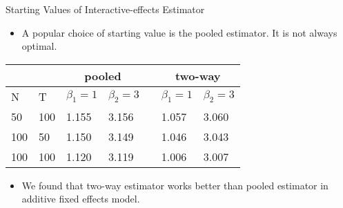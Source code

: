 \documentclass{beamer}
\begin{document}
\begin{frame}{Starting Values of Interactive-effects Estimator}

\begin{itemize}
    \item A popular choice of starting value is the pooled estimator. It is not always optimal.
\end{itemize}

\begin{table}[]
\begin{tabular}{lllllll}
 &  & \multicolumn{2}{c}{pooled} &  & \multicolumn{2}{c}{two-way} \\ \hline
\multicolumn{1}{l|}{N} & \multicolumn{1}{l|}{T} & \multicolumn{1}{l|}{$\beta_1=1$} & \multicolumn{1}{l|}{$\beta_2=3$} & \multicolumn{1}{l|}{} & \multicolumn{1}{l|}{$\beta_1=1$} & \multicolumn{1}{l}{$\beta_2=3$} \\ \cline{1-4} \cline{6-7}
\multicolumn{1}{l|}{50} & \multicolumn{1}{l|}{100} & \multicolumn{1}{l|}{1.155} & \multicolumn{1}{l|}{3.156} & \multicolumn{1}{l|}{} & \multicolumn{1}{l|}{1.057} & \multicolumn{1}{l}{3.060} \\ \cline{1-4} \cline{6-7}
\multicolumn{1}{l|}{100} & \multicolumn{1}{l|}{50} & \multicolumn{1}{l|}{1.150} & \multicolumn{1}{l|}{3.149} & \multicolumn{1}{l|}{} & \multicolumn{1}{l|}{1.046} & \multicolumn{1}{l}{3.043} \\ \cline{1-4} \cline{6-7}
\multicolumn{1}{l|}{100} & \multicolumn{1}{l|}{100} & \multicolumn{1}{l|}{1.120} & \multicolumn{1}{l|}{3.119} & \multicolumn{1}{l|}{} & \multicolumn{1}{l|}{1.006} & \multicolumn{1}{l}{3.007} \\ \hline
\end{tabular}
\end{table}

\begin{itemize}
     \item We found that two-way estimator works better than pooled estimator in additive fixed effects model.
\end{itemize}
\end{frame}
\end{document}
